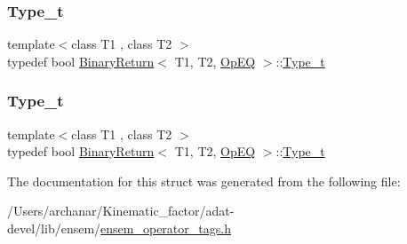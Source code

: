 \mbox{\label{structBinaryReturn_3_01T1_00_01T2_00_01OpEQ_01_4_a9dae4026d9a8e83b1f6b0d130201d5f5}} 
\subsubsection{\texorpdfstring{Type\_t}{Type\_t}\hspace{0.1cm}{\footnotesize\ttfamily [2/3]}}
{\footnotesize\ttfamily template$<$class T1 , class T2 $>$ \\
typedef bool \mbox{\hyperlink{structBinaryReturn}{Binary\+Return}}$<$ T1, T2, \mbox{\hyperlink{structOpEQ}{Op\+EQ}} $>$\+::\mbox{\hyperlink{structBinaryReturn_3_01T1_00_01T2_00_01OpEQ_01_4_a9dae4026d9a8e83b1f6b0d130201d5f5}{Type\+\_\+t}}}

\mbox{\label{structBinaryReturn_3_01T1_00_01T2_00_01OpEQ_01_4_a9dae4026d9a8e83b1f6b0d130201d5f5}} 
\subsubsection{\texorpdfstring{Type\_t}{Type\_t}\hspace{0.1cm}{\footnotesize\ttfamily [3/3]}}
{\footnotesize\ttfamily template$<$class T1 , class T2 $>$ \\
typedef bool \mbox{\hyperlink{structBinaryReturn}{Binary\+Return}}$<$ T1, T2, \mbox{\hyperlink{structOpEQ}{Op\+EQ}} $>$\+::\mbox{\hyperlink{structBinaryReturn_3_01T1_00_01T2_00_01OpEQ_01_4_a9dae4026d9a8e83b1f6b0d130201d5f5}{Type\+\_\+t}}}



The documentation for this struct was generated from the following file\+:\begin{DoxyCompactItemize}
\item 
/\+Users/archanar/\+Kinematic\+\_\+factor/adat-\/devel/lib/ensem/\mbox{\hyperlink{adat-devel_2lib_2ensem_2ensem__operator__tags_8h}{ensem\+\_\+operator\+\_\+tags.\+h}}\end{DoxyCompactItemize}
